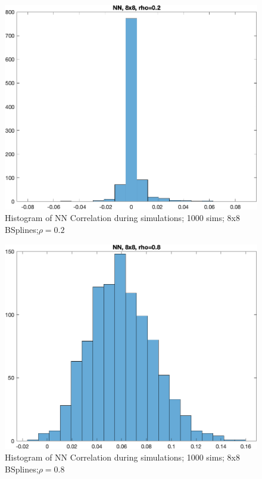 \documentclass[
]{article}
\begin{document}
\begin{figure}[H]

{\centering \includegraphics{../figures/hist_nn_rho-0.2_Opt_PC_NN_0.png}

}

\caption{Histogram of NN Correlation during simulations; 1000 sims; 8x8
BSplines;\(\rho=0.2\)}

\end{figure}%
\begin{figure}[H]

{\centering \includegraphics{../figures/hist_nn_rho-0.8_Opt_PC_NN_0.png}

}

\caption{Histogram of NN Correlation during simulations; 1000 sims; 8x8
BSplines;\(\rho=0.8\)}

\end{figure}%
\end{document}
